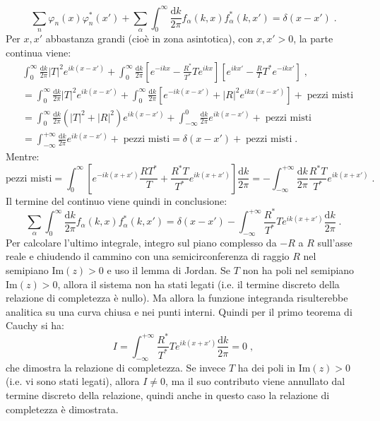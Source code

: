 \documentclass[10pt,a4paper]{report}
\theoremstyle{definition}
\numberwithin{equation}{section}
\newcommand{\diff}[1][]{\mathrm{d}#1}
\begin{document}
\begin{equation}
\sum_n \varphi_n(x)\varphi^*_n(x')+\sum_{\alpha}\int_0^{\infty} \frac{\diff{k}}{2\pi}f_{\alpha}(k,x)f^*_{\alpha}(k,x')=\delta(x-x')\;.
\end{equation}
Per $x,x'$ abbastanza grandi (cioè in zona asintotica), con $x,x'>0$, la parte continua viene:
\begin{align*}
&\int_0^{\infty}\frac{\diff{k}}{2\pi}|T|^2e^{ik(x-x')}+\int_0^{\infty}\frac{\diff{k}}{2\pi}\left[e^{-ikx}-\frac{R^*}{T^*}Te^{ikx}\right]\left[e^{ikx'}-\frac{R}{T}T^*e^{-ikx'}\right] \;, \\
&=\int_0^{\infty}\frac{\diff{k}}{2\pi}|T|^2e^{ik(x-x')}+\int_0^{\infty}\frac{\diff{k}}{2\pi}\left[e^{-ik(x-x')}+|R|^2e^{ikx(x-x')}\right]+\;\mbox{pezzi misti} \\
&=\int_0^{\infty}\frac{\diff{k}}{2\pi}(|T|^2+|R|^2)e^{ik(x-x')}+\int_{-\infty}^0\frac{\diff{k}}{2\pi}e^{ik(x-x')}+\;\mbox{pezzi misti} \\
&=\int_{-\infty}^{+\infty}\frac{\diff{k}}{2\pi}e^{ik(x-x')}+\;\mbox{pezzi misti}=\delta(x-x')+\;\mbox{pezzi misti}\;.
\end{align*}
Mentre:
$$
\mbox{pezzi misti} = \int_0^{\infty}\left[e^{-ik(x+x')}\frac{RT^*}{T}+\frac{R^*T}{T^*}e^{ik(x+x')}\right]\frac{\diff{k}}{2\pi}=-\int_{-\infty}^{+\infty}\frac{\diff{k}}{2\pi}\frac{R^* T}{T^*}e^{ik(x+x')}\;.
$$
Il termine del continuo viene quindi in conclusione:
\begin{equation}
\sum_{\alpha}\int_0^{\infty}\frac{\diff{k}}{2\pi}f_{\alpha}(k,x)f_{\alpha}^*(k,x')=\delta(x-x')-\int_{-\infty}^{+\infty} \frac{R^*}{T^*}Te^{ik(x+x')}\frac{\diff{k}}{2\pi}\;.
\end{equation}
Per calcolare l'ultimo integrale, integro sul piano complesso da $-R$ a $R$ sull'asse reale e chiudendo il cammino con una semicirconferenza di raggio $R$ nel semipiano $\mathrm{Im}(z)>0$ e uso il lemma di Jordan. Se $T$ non ha poli nel semipiano $\mathrm{Im}(z)>0$, allora il sistema non ha stati legati (i.e. il termine discreto della relazione di completezza è nullo). Ma allora la funzione integranda risulterebbe analitica su una curva chiusa e nei punti interni. Quindi per il primo teorema di Cauchy si ha:
$$
I=\int_{-\infty}^{+\infty} \frac{R^*}{T^*}Te^{ik(x+x')}\frac{\diff{k}}{2\pi}=0\;,
$$
che dimostra la relazione di completezza. Se invece $T$ ha dei poli in $\mathrm{Im}(z)>0$ (i.e. vi sono stati legati), allora $I\ne 0$, ma il suo contributo viene annullato dal termine discreto della relazione, quindi anche in questo caso la relazione di completezza è dimostrata. \\
\end{document}
